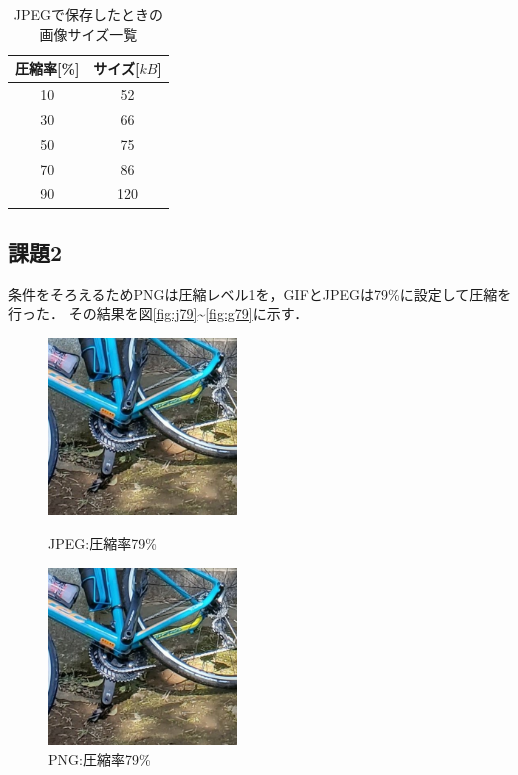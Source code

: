 \documentclass[a4paper,11pt]{bxjsarticle}
\begin{document}
   \begin{table}[htb]
    \begin{center}
      \caption{JPEGで保存したときの画像サイズ一覧}
      \begin{tabular}{|c|c|} \hline
        圧縮率[\%] & サイズ[$kB$] \\\hline
        10 & 52  \\
        30 & 66  \\ 
        50 & 75  \\
        70 & 86  \\
        90 & 120  \\\hline

      \end{tabular}
      \label{tab:result_jpeg_filesize}
    \end{center}
  \end{table}
\newpage
  \subsection{課題2}
    条件をそろえるためPNGは圧縮レベル1を，GIFとJPEGは79\%に設定して圧縮を行った．
    その結果を図\ref{fig:j79}\textasciitilde\ref{fig:g79}に示す．

    \begin{figure}[htbp]
      \begin{minipage}{0.5\hsize}
       \begin{center}
        \includegraphics[width=50mm]{sample_j79.eps}
       \end{center}
       \caption{JPEG:圧縮率79\%}
       \label{fig:j79}
      \end{minipage}
      \begin{minipage}{0.5\hsize}
       \begin{center}
        \includegraphics[width=50mm]{sample_p79.eps}
       \end{center}
       \caption{PNG:圧縮率79\%}
       \label{fig:p79}
      \end{minipage}
     \end{figure}
\end{document}
